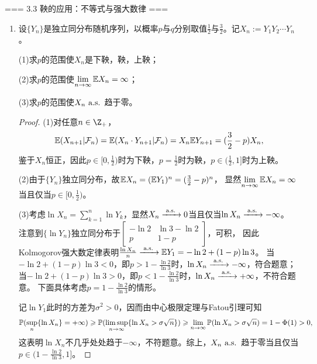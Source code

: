 === 3.3 鞅的应用：不等式与强大数律 ===
\begin{enumerate}
    \item[3.3.3] 设$\{Y_n\}$是独立同分布随机序列，以概率$p$与$q$分别取值$\frac{1}{2}$与$\frac{3}{2}$。记$X_n:=Y_1Y_2\cdots Y_n$。

    (1)求$p$的范围使$X_n$是下鞅，鞅，上鞅；

    (2)求$p$的范围使$\lim\limits_{n\to\infty}\E X_n=\infty$；

    (3)求$p$的范围使$X_n\as$趋于零。
    \begin{proof}
        (1)对任意$n\in\Z_+$，\[\E(X_{n+1}|\F_n)=\E(X_n\cdot Y_{n+1}|\F_n)=X_n\E Y_{n+1}=(\frac{3}{2}-p)X_n,\]
        鉴于$X_n$恒正，因此$p\in[0,\frac{1}{2})$时为下鞅，$p=\frac{1}{2}$时为鞅，$p\in(\frac{1}{2},1]$时为上鞅。

        (2)由于$\{Y_n\}$独立同分布，故$\E X_n=(\E Y_1)^n=(\frac{3}{2}-p)^n$，
        显然$\lim\limits_{n\to\infty}\E X_n=\infty$当且仅当$p\in[0,\frac{1}{2})$。

        (3)考虑$\ln X_n=\sum\limits_{k=1}^n\ln Y_k$，显然$X_n\xrightarrow{\as}0$当且仅当$\ln X_n\xrightarrow{\as}-\infty$。
        注意到$\{\ln Y_n\}$独立同分布于$\begin{bmatrix}-\ln2&\ln3-\ln2\\p&1-p\end{bmatrix}$，可积，
        因此Kolmogorov强大数定律表明$\frac{\ln X_n}{n}\xrightarrow{\as}\E Y_1=-\ln2+(1-p)\ln3$。
        当$-\ln2+(1-p)\ln3<0$，即$p>1-\frac{\ln2}{\ln3}$时，$\ln X_n\xrightarrow{\as}-\infty$，符合题意；
        当$-\ln2+(1-p)\ln3>0$，即$p<1-\frac{\ln2}{\ln3}$时，$\ln X_n\xrightarrow{\as}+\infty$，不符合题意。
        下面具体考虑$p=1-\frac{\ln2}{\ln3}$的情形。

        记$\ln Y_1$此时的方差为$\sigma^2>0$，因而由中心极限定理与Fatou引理可知
        \[\P(\sup_n\{\ln X_n\}=+\infty)\geqslant\P(\limsup_{n\to\infty}\{\ln X_n>\sigma\sqrt{n}\})
        \geqslant\lim_{n\to\infty}\P(\ln X_n>\sigma\sqrt{n})=1-\Phi(1)>0,\]
        这表明$\ln X_n$不几乎处处趋于$-\infty$，不符题意。综上，$X_n\as$趋于零当且仅当$p\in(1-\frac{\ln2}{\ln3},1]$。
    \end{proof}
\end{enumerate}


